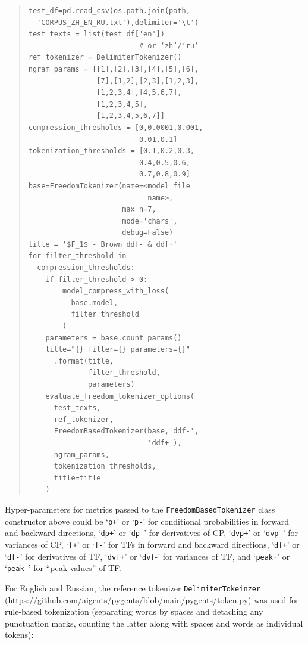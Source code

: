 \documentclass[11pt]{article}
\begin{document}
\begin{quote}\begin{small}
\begin{verbatim}
test_df=pd.read_csv(os.path.join(path,
  'CORPUS_ZH_EN_RU.txt'),delimiter='\t')
test_texts = list(test_df['en']) 
                          # or ‘zh’/‘ru’
ref_tokenizer = DelimiterTokenizer()
ngram_params = [[1],[2],[3],[4],[5],[6],
                [7],[1,2],[2,3],[1,2,3],
                [1,2,3,4],[4,5,6,7],
                [1,2,3,4,5],
                [1,2,3,4,5,6,7]]
compression_thresholds = [0,0.0001,0.001,
                          0.01,0.1]
tokenization_thresholds = [0.1,0.2,0.3,
                          0.4,0.5,0.6,
                          0.7,0.8,0.9] 
base=FreedomTokenizer(name=<model file 
                            name>,
                      max_n=7, 
                      mode='chars',
                      debug=False)
title = '$F_1$ - Brown ddf- & ddf+'
for filter_threshold in 
  compression_thresholds:
    if filter_threshold > 0:
        model_compress_with_loss(
          base.model,
          filter_threshold
        )
    parameters = base.count_params()
    title="{} filter={} parameters={}"
      .format(title,
              filter_threshold,
              parameters)
    evaluate_freedom_tokenizer_options(
      test_texts,
      ref_tokenizer,
      FreedomBasedTokenizer(base,'ddf-',
                            'ddf+'),
      ngram_params,
      tokenization_thresholds,
      title=title
    )
\end{verbatim}
\end{small}\end{quote}

Hyper-parameters for metrics passed to the \texttt{FreedomBasedTokenizer} class constructor above could be ‘\texttt{p+}’ or ‘\texttt{p-}’ for conditional probabilities in forward and backward directions, ‘\texttt{dp+}’ or ‘\texttt{dp-}’ for derivatives of CP, ‘\texttt{dvp+}’ or ‘\texttt{dvp-}’ for variances of CP, ‘\texttt{f+}’ or ‘\texttt{f-}’ for TFs in forward and backward directions, ‘\texttt{df+}’ or ‘\texttt{df-}’ for derivatives of TF, ‘\texttt{dvf+}’ or ‘\texttt{dvf}-’ for variances of TF, and ‘\texttt{peak+}’ or ‘\texttt{peak-}’ for “peak values” of TF.

For English and Russian, the reference tokenizer \texttt{DelimiterTokeinzer} (\url{https://github.com/aigents/pygents/blob/main/pygents/token.py}) was used for rule-based tokenization (separating words by spaces and detaching any punctuation marks, counting the latter along with spaces and words as individual tokens):
\end{document}
